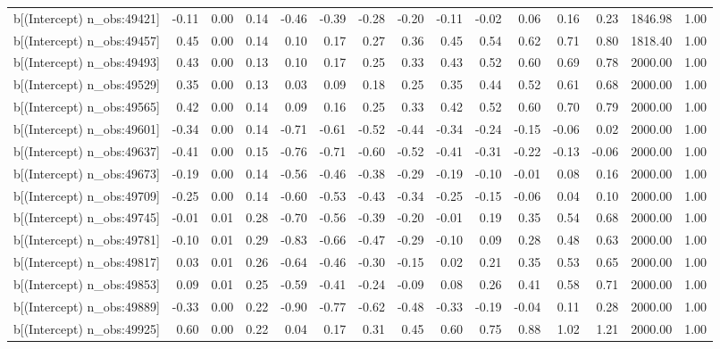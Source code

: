 \begin{table}[ht]
\begin{tabular}{rrrrrrrrrrrrrrr}
  b[(Intercept) n\_obs:49421] & -0.11 & 0.00 & 0.14 & -0.46 & -0.39 & -0.28 & -0.20 & -0.11 & -0.02 & 0.06 & 0.16 & 0.23 & 1846.98 & 1.00 \\ 
  b[(Intercept) n\_obs:49457] & 0.45 & 0.00 & 0.14 & 0.10 & 0.17 & 0.27 & 0.36 & 0.45 & 0.54 & 0.62 & 0.71 & 0.80 & 1818.40 & 1.00 \\ 
  b[(Intercept) n\_obs:49493] & 0.43 & 0.00 & 0.13 & 0.10 & 0.17 & 0.25 & 0.33 & 0.43 & 0.52 & 0.60 & 0.69 & 0.78 & 2000.00 & 1.00 \\ 
  b[(Intercept) n\_obs:49529] & 0.35 & 0.00 & 0.13 & 0.03 & 0.09 & 0.18 & 0.25 & 0.35 & 0.44 & 0.52 & 0.61 & 0.68 & 2000.00 & 1.00 \\ 
  b[(Intercept) n\_obs:49565] & 0.42 & 0.00 & 0.14 & 0.09 & 0.16 & 0.25 & 0.33 & 0.42 & 0.52 & 0.60 & 0.70 & 0.79 & 2000.00 & 1.00 \\ 
  b[(Intercept) n\_obs:49601] & -0.34 & 0.00 & 0.14 & -0.71 & -0.61 & -0.52 & -0.44 & -0.34 & -0.24 & -0.15 & -0.06 & 0.02 & 2000.00 & 1.00 \\ 
  b[(Intercept) n\_obs:49637] & -0.41 & 0.00 & 0.15 & -0.76 & -0.71 & -0.60 & -0.52 & -0.41 & -0.31 & -0.22 & -0.13 & -0.06 & 2000.00 & 1.00 \\ 
  b[(Intercept) n\_obs:49673] & -0.19 & 0.00 & 0.14 & -0.56 & -0.46 & -0.38 & -0.29 & -0.19 & -0.10 & -0.01 & 0.08 & 0.16 & 2000.00 & 1.00 \\ 
  b[(Intercept) n\_obs:49709] & -0.25 & 0.00 & 0.14 & -0.60 & -0.53 & -0.43 & -0.34 & -0.25 & -0.15 & -0.06 & 0.04 & 0.10 & 2000.00 & 1.00 \\ 
  b[(Intercept) n\_obs:49745] & -0.01 & 0.01 & 0.28 & -0.70 & -0.56 & -0.39 & -0.20 & -0.01 & 0.19 & 0.35 & 0.54 & 0.68 & 2000.00 & 1.00 \\ 
  b[(Intercept) n\_obs:49781] & -0.10 & 0.01 & 0.29 & -0.83 & -0.66 & -0.47 & -0.29 & -0.10 & 0.09 & 0.28 & 0.48 & 0.63 & 2000.00 & 1.00 \\ 
  b[(Intercept) n\_obs:49817] & 0.03 & 0.01 & 0.26 & -0.64 & -0.46 & -0.30 & -0.15 & 0.02 & 0.21 & 0.35 & 0.53 & 0.65 & 2000.00 & 1.00 \\ 
  b[(Intercept) n\_obs:49853] & 0.09 & 0.01 & 0.25 & -0.59 & -0.41 & -0.24 & -0.09 & 0.08 & 0.26 & 0.41 & 0.58 & 0.71 & 2000.00 & 1.00 \\ 
  b[(Intercept) n\_obs:49889] & -0.33 & 0.00 & 0.22 & -0.90 & -0.77 & -0.62 & -0.48 & -0.33 & -0.19 & -0.04 & 0.11 & 0.28 & 2000.00 & 1.00 \\ 
  b[(Intercept) n\_obs:49925] & 0.60 & 0.00 & 0.22 & 0.04 & 0.17 & 0.31 & 0.45 & 0.60 & 0.75 & 0.88 & 1.02 & 1.21 & 2000.00 & 1.00 \\ 

\end{tabular}
\end{table}

